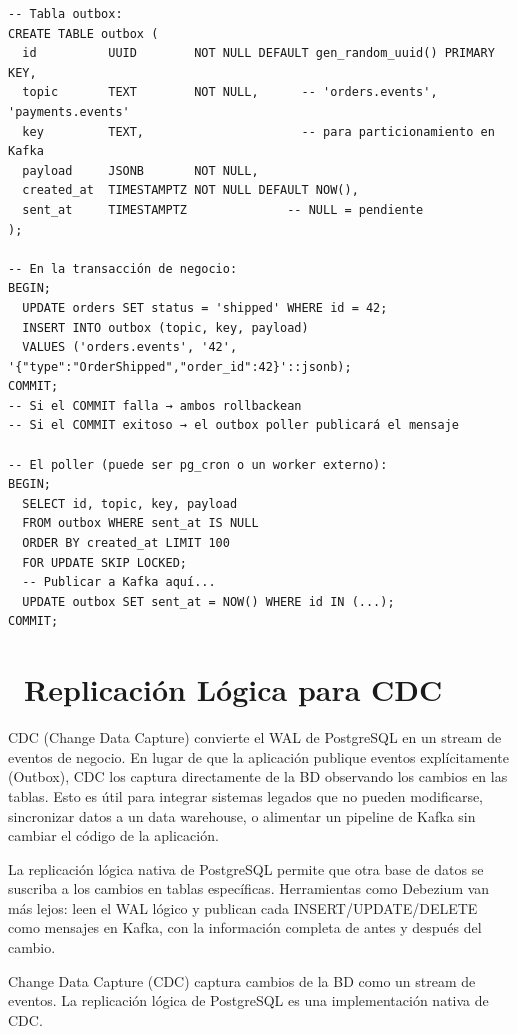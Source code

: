\begin{lstlisting}[caption={Outbox table y proceso}]
-- Tabla outbox:
CREATE TABLE outbox (
  id          UUID        NOT NULL DEFAULT gen_random_uuid() PRIMARY KEY,
  topic       TEXT        NOT NULL,      -- 'orders.events', 'payments.events'
  key         TEXT,                      -- para particionamiento en Kafka
  payload     JSONB       NOT NULL,
  created_at  TIMESTAMPTZ NOT NULL DEFAULT NOW(),
  sent_at     TIMESTAMPTZ              -- NULL = pendiente
);

-- En la transacción de negocio:
BEGIN;
  UPDATE orders SET status = 'shipped' WHERE id = 42;
  INSERT INTO outbox (topic, key, payload)
  VALUES ('orders.events', '42', '{"type":"OrderShipped","order_id":42}'::jsonb);
COMMIT;
-- Si el COMMIT falla → ambos rollbackean
-- Si el COMMIT exitoso → el outbox poller publicará el mensaje

-- El poller (puede ser pg_cron o un worker externo):
BEGIN;
  SELECT id, topic, key, payload
  FROM outbox WHERE sent_at IS NULL
  ORDER BY created_at LIMIT 100
  FOR UPDATE SKIP LOCKED;
  -- Publicar a Kafka aquí...
  UPDATE outbox SET sent_at = NOW() WHERE id IN (...);
COMMIT;
\end{lstlisting}

\section[Replicación Lógica para CDC]{~Replicación Lógica para CDC}

CDC (Change Data Capture) convierte el WAL de PostgreSQL en un stream de eventos de negocio.
En lugar de que la aplicación publique eventos explícitamente (Outbox), CDC los captura directamente de la BD observando los cambios en las tablas.
Esto es útil para integrar sistemas legados que no pueden modificarse, sincronizar datos a un data warehouse, o alimentar un pipeline de Kafka sin cambiar el código de la aplicación.

La replicación lógica nativa de PostgreSQL permite que otra base de datos se suscriba a los cambios en tablas específicas.
Herramientas como Debezium van más lejos: leen el WAL lógico y publican cada INSERT/UPDATE/DELETE como mensajes en Kafka, con la información completa de antes y después del cambio.

Change Data Capture (CDC) captura cambios de la BD como un stream de eventos.
La replicación lógica de PostgreSQL es una implementación nativa de CDC.

